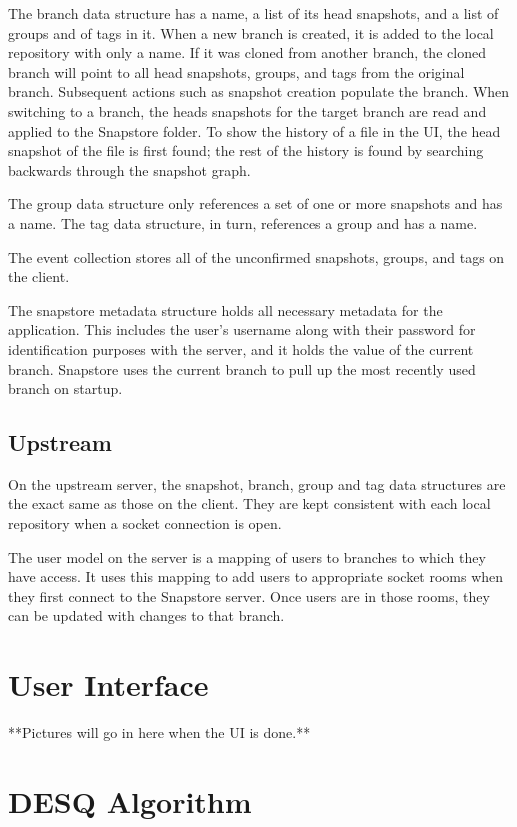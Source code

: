 The branch data structure has a name, a list of its head snapshots, and a list of groups and of tags in it. When a new branch is created, it is added to the local repository with only a name. If it was cloned from another branch, the cloned branch will point to all head snapshots, groups, and tags from the original branch. Subsequent actions such as snapshot creation populate the branch. When switching to a branch, the heads snapshots for the target branch are read and applied to the Snapstore folder. To show the history of a file in the UI, the head snapshot of the file is first found; the rest of the history is found by searching backwards through the snapshot graph.

The group data structure only references a set of one or more snapshots and has a name. The tag data structure, in turn, references a group and has a name.

The event collection stores all of the unconfirmed snapshots, groups, and tags on the client.

The snapstore metadata structure holds all necessary metadata for the application. This includes the user's username along with their password for identification purposes with the server, and it holds the value of the current branch. Snapstore uses the current branch to pull up the most recently used branch on startup.

\subsection{Upstream}

On the upstream server, the snapshot, branch, group and tag data structures are the exact same as those on the client. They are kept consistent with each local repository when a socket connection is open.

The user model on the server is a mapping of users to branches to which they have access. It uses this mapping to add users to appropriate socket rooms when they first connect to the Snapstore server. Once users are in those rooms, they can be updated with changes to that branch.

\section{User Interface}

**Pictures will go in here when the UI is done.**

\section{DESQ Algorithm}

